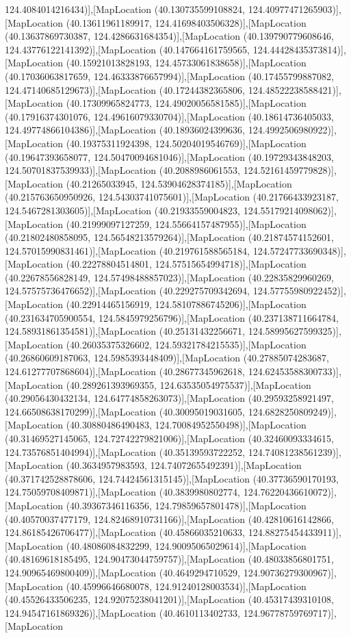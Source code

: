 124.4084014216434)],[MapLocation (40.130735599108824, 124.40977471265903)],[MapLocation (40.13611961189917, 124.41698403506328)],[MapLocation (40.13637869730387, 124.4286631684354)],[MapLocation (40.139790779608646, 124.43776122141392)],[MapLocation (40.147664161759565, 124.44428435373814)],[MapLocation (40.15921013828193, 124.45733061838658)],[MapLocation (40.17036063817659, 124.46333876657994)],[MapLocation (40.17455799887082, 124.47140685129673)],[MapLocation (40.17244382365806, 124.48522238588421)],[MapLocation (40.17309965824773, 124.49020056581585)],[MapLocation (40.17916374301076, 124.49616079330704)],[MapLocation (40.18614736405033, 124.49774866104386)],[MapLocation (40.18936024399636, 124.4992506980922)],[MapLocation (40.19375311924398, 124.50204019546769)],[MapLocation (40.19647393658077, 124.50470094681046)],[MapLocation (40.19729343848203, 124.50701837539933)],[MapLocation (40.2088986061553, 124.52161459779828)],[MapLocation (40.21265033945, 124.53904628374185)],[MapLocation (40.215763650950926, 124.54303741075601)],[MapLocation (40.21766433923187, 124.5467281303605)],[MapLocation (40.21933559004823, 124.55179214098062)],[MapLocation (40.21999097127259, 124.55664157487955)],[MapLocation (40.21802480858095, 124.56548213579264)],[MapLocation (40.21874574152601, 124.57015990831461)],[MapLocation (40.219761588565184, 124.57247733690348)],[MapLocation (40.22278804514801, 124.57515654994718)],[MapLocation (40.22678556828149, 124.57498488857023)],[MapLocation (40.22835829960269, 124.57575736476652)],[MapLocation (40.229275709342694, 124.57755980922452)],[MapLocation (40.22914465156919, 124.58107886745206)],[MapLocation (40.231634705900554, 124.5845979256796)],[MapLocation (40.237138711664784, 124.58931861354581)],[MapLocation (40.25131432256671, 124.58995627599325)],[MapLocation (40.26035375326602, 124.59321784215535)],[MapLocation (40.26860609187063, 124.5985393448409)],[MapLocation (40.27885074283687, 124.61277707868604)],[MapLocation (40.28677345962618, 124.62453588300733)],[MapLocation (40.289261393969355, 124.63535054975537)],[MapLocation (40.29056430432134, 124.64774858263073)],[MapLocation (40.29593258921497, 124.66508638170299)],[MapLocation (40.30095019031605, 124.6828250809249)],[MapLocation (40.30880486490483, 124.70084952550498)],[MapLocation (40.31469527145065, 124.72742279821006)],[MapLocation (40.32460093334615, 124.73576851404994)],[MapLocation (40.35139593722252, 124.74081238561239)],[MapLocation (40.3634957983593, 124.74072655492391)],[MapLocation (40.371742528878606, 124.74424561315145)],[MapLocation (40.37736590170193, 124.75059708409871)],[MapLocation (40.3839980802774, 124.76220436610072)],[MapLocation (40.39367346116356, 124.79859657801478)],[MapLocation (40.40570037477179, 124.82468910731166)],[MapLocation (40.42810616142866, 124.86185426706477)],[MapLocation (40.45866035210633, 124.88275454433911)],[MapLocation (40.48086084832299, 124.90095065029614)],[MapLocation (40.48169618185495, 124.90473044759757)],[MapLocation (40.48033856801751, 124.90965469800409)],[MapLocation (40.4649294710529, 124.90736279300967)],[MapLocation (40.45996646680078, 124.91240128003534)],[MapLocation (40.45526433506235, 124.92075238041201)],[MapLocation (40.45317439310108, 124.94547161869326)],[MapLocation (40.4610113402733, 124.96778759769717)],[MapLocation 